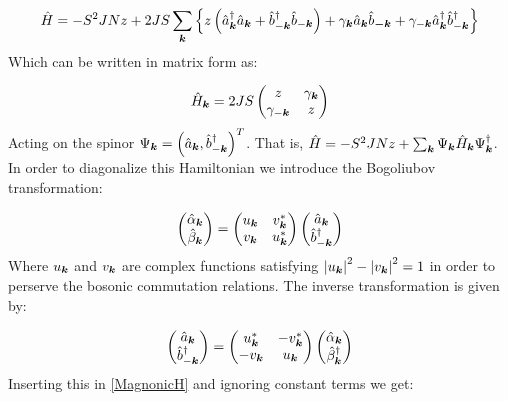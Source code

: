 \begin{equation}
\label{MagnonicH}
\hat{H} = -S^2JNz + 2JS \sum_{\boldsymbol{k}} \left\{ z \left( \hat{a}^\dagger_{\boldsymbol{k}}\hat{a}_{\boldsymbol{k}} + \hat{b}^\dagger_{-\boldsymbol{k}}\hat{b}_{-\boldsymbol{k}} \right) + \gamma_{\boldsymbol{k}}\hat{a}_{\boldsymbol{k}}\hat{b}_{\boldsymbol{-k}} + \gamma_{-\boldsymbol{k}}\hat{a}^\dagger_{\boldsymbol{k}}\hat{b}^\dagger_{-\boldsymbol{k}} \right\}
\end{equation}
Which can be written in matrix form as:

\begin{equation}
\hat{H}_{\boldsymbol{k}} = 2JS\begin{pmatrix} 
z & \gamma_{\boldsymbol{k}} \\
\gamma_{-\boldsymbol{k}} & z
\end{pmatrix}
\end{equation}
Acting on the spinor $\Psi_{\boldsymbol{k}} = \left(\hat{a}_{\boldsymbol{k}},\hat{b}_{-\boldsymbol{k}}^\dagger \right)^T$. That is, $\hat{H} = -S^2JNz + \sum_{\boldsymbol{k}} \Psi_{\boldsymbol{k}} \hat{H}_{\boldsymbol{k}} \Psi^\dagger_{\boldsymbol{k}}$. In order to diagonalize this Hamiltonian we introduce the Bogoliubov transformation:

\begin{equation}
\label{Bogoliubov}
\begin{pmatrix}
\hat{\alpha}_{\boldsymbol{k}} \\
\hat{\beta}_{\boldsymbol{k}}
\end{pmatrix} = 
\begin{pmatrix}
u_{\boldsymbol{k}} & v_{\boldsymbol{k}}^* \\
v_{\boldsymbol{k}} & u_{\boldsymbol{k}}^*
\end{pmatrix}
\begin{pmatrix}
\hat{a}_{\boldsymbol{k}} \\
\hat{b}_{-\boldsymbol{k}}^\dagger
\end{pmatrix}
\end{equation}
Where $u_{\boldsymbol{k}}$ and $v_{\boldsymbol{k}}$ are complex functions satisfying $\abs{u_{\boldsymbol{k}}}^2-\abs{v_{\boldsymbol{k}}}^2 = 1$ in order to perserve the bosonic commutation relations. The inverse transformation is given by:

\begin{equation}
\label{BogoliubovInv}
\begin{pmatrix}
\hat{a}_{\boldsymbol{k}} \\
\hat{b}_{-\boldsymbol{k}}^\dagger
\end{pmatrix} = 
\begin{pmatrix}
u_{\boldsymbol{k}}^* & -v_{\boldsymbol{k}}^* \\
-v_{\boldsymbol{k}} & u_{\boldsymbol{k}}
\end{pmatrix}
\begin{pmatrix}
\hat{\alpha}_{\boldsymbol{k}} \\
\hat{\beta}_{\boldsymbol{k}}^\dagger
\end{pmatrix}
\end{equation}
Inserting this in \ref{MagnonicH} and ignoring constant terms we get:

